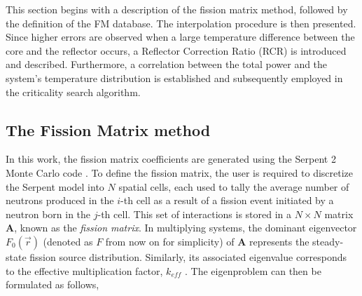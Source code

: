 \documentclass[preprint,review,12pt]{elsarticle}
\begin{document}
This section begins with a description of the fission matrix method, followed by the definition of the FM database. The interpolation procedure is then presented.
Since higher errors are observed when a large temperature difference between the core and the reflector occurs, a Reflector Correction Ratio (RCR) is introduced and described. Furthermore, a correlation between the total power and the system’s temperature distribution is established and subsequently employed in the criticality search algorithm.

\subsection{The Fission Matrix method} \label{subsection:Fission matrix definition}
In this work, the fission matrix coefficients are generated using the Serpent 2 Monte Carlo code \cite{LEPPANEN2025}.
To define the fission matrix, the user is required to discretize the Serpent model into $N$ spatial cells, each used to tally the average number of neutrons produced in the $i$-th cell as a result of a fission event initiated by a neutron born in the $j$-th cell. This set of interactions is stored in a $N \times N$ matrix $\textbf{A}$, known as the \textit{fission matrix}. In multiplying systems, the dominant eigenvector $F_0(\vec{r})$ (denoted as $F$ from now on for simplicity) of $\textbf{A}$ represents the steady-state fission source distribution. Similarly, its associated eigenvalue corresponds to the effective multiplication factor, $k_{eff}$ \cite{Carney2014}. The eigenproblem can then be formulated as follows,
\end{document}
